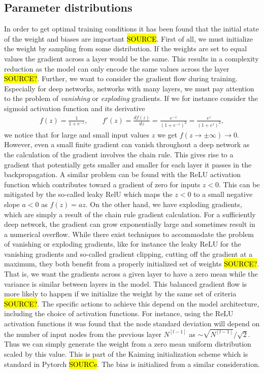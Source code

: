 \subsection{Parameter distributions}
In order to get optimal training conditions it has been found that the initial
state of the weight and biases are important \hl{SOURCE}. First of all, we must
initialize the weight by sampling from some distribution. If the weights are set
to equal values the gradient across a layer would be the same. This results in a
complexity reduction as the model can only encode the same values across the
layer \hl{SOURCE?}. Further, we want to consider the gradient flow during training. Especially for deep networks, networks with many layers, we must pay attention to the problem of \textit{vanishing} or \textit{exploding} gradients. If we for instance consider the sigmoid activation function and its derivative 
\begin{align*}
  f(z) = \frac{1}{1 + e^{-z}}, \qquad f'(z) = \frac{df(z)}{dz} = \frac{e^{-z}}{(1+e^{-z})^2} = \frac{e^{z}}{(1+e^{z})^2},
\end{align*}
we notice that for large and small input values $z$ we get $f(z\to \pm\infty)
\to 0$. However, even a small finite gradient can vanish throughout a deep
network as the calculation of the gradient involves the chain rule. This gives
rise to a gradient that potentially gets smaller and smaller for each layer it
passes in the backpropagation. A similar problem can be found with the ReLU
activation function which contributes toward a gradient of zero for inputs
$z<0$. This can be mitigated by the so-called leaky RelU which maps the $z<0$
to a small negative slope $a<0$ as $f(z) = az$. On the other hand, we have
exploding gradients, which are simply a result of the chain rule gradient
calculation. For a sufficiently deep network, the gradient can grow
exponentially large and sometimes result in a numerical overflow. While there
exist techniques to accommodate the problem of vanishing or exploding gradients,
like for instance the leaky ReLU for the vanishing gradients and so-called
gradient clipping, cutting off the gradient at a maximum, they both benefit from
a properly initialized set of weights \hl{SOURCE?}. That is, we want the
gradients across a given layer to have a zero mean while the variance is similar
between layers in the model. This balanced gradient flow is more likely to
happen if we initialize the weight by the same set of criteria \hl{SOURCE?}. The
specific actions to achieve this depend on the model architecture, including the
choice of activation functions. For instance, using the ReLU activation
functions it was found that the node standard deviation will depend on the
number of input nodes from the previous layer $N^{[l-1]}$ as $\sim
\sqrt{N^{[l-1]}}/\sqrt{2}$. Thus we can simply generate the weight from a zero mean uniform distribution scaled by this value. This is part of the Kaiming initialization scheme which is standard in Pytorch \hl{SOURCe}. The bias is initialized from a similar consideration.

